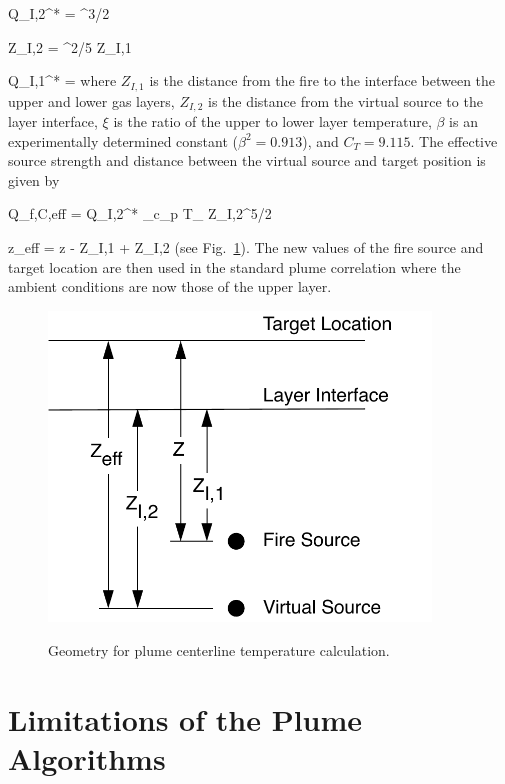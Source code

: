 \be Q_{I,2}^* = ^{3/2} \ee

\be Z_{I,2} = ^{2/5} Z_{I,1}  \ee

\be Q_{I,1}^* =   \ee
where $Z_{I,1}$ is the distance from the fire to the interface between the upper and lower gas layers, $Z_{I,2}$ is the distance from the virtual source to the layer interface, $\xi$ is the ratio of the upper to lower layer temperature, $\beta$ is an experimentally determined constant \cite{Zukoski:1981} ($\beta^2 = 0.913$), and $C_T = 9.115$.  The effective source strength and distance between the virtual source and target position is given by

\be Q_{f,C,eff} = Q_{I,2}^* \rho_\infty c_{p\infty} T_\infty {} Z_{I,2}^{5/2}  \ee

\be z_{eff} = z - Z_{I,1} + Z_{I,2} \ee
(see Fig.~\ref{fig:Plume_Temp_Notation}). The new values of the fire source and  target location are then used in the standard plume correlation where the ambient conditions are now those of the upper layer.
\begin{figure}
\begin{center}
\includegraphics[width=4.0in]{FIGURES/Theory/Plume_Temp_Notation}\\
\end{center}
\caption{Geometry for plume centerline temperature calculation.}
 \label{fig:Plume_Temp_Notation}
\end{figure}

\section{Limitations of the Plume Algorithms} \label{sec:plumelimits}

